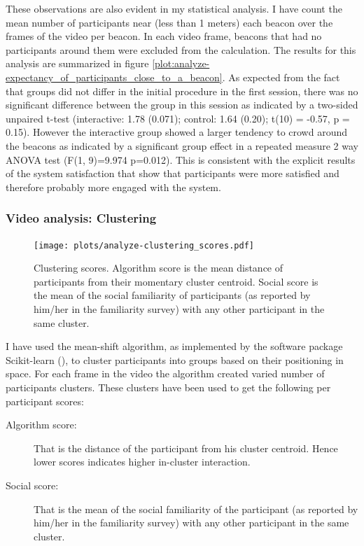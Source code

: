\documentclass[a4paper,11pt]{article}
\begin{document}
{These observations are also evident in my statistical analysis.
I have count the mean number of participants near (less than 1 meters) each beacon over the frames of the video per beacon.
In each video frame, beacons that had no participants around them were excluded from the calculation.
The results for this analysis are summarized in figure \ref{plot:analyze-expectancy_of_participants_close_to_a_beacon}.
As expected from the fact that groups did not differ in the initial procedure in the first session, there was no significant difference between the group in this session as indicated by a two-sided unpaired t-test (interactive: 1.78 (0.071); control: 1.64 (0.20); t(10) = -0.57, p = 0.15).
However the interactive group showed a larger tendency to crowd around the beacons as indicated by a significant group effect in a repeated measure 2 way ANOVA test (F(1, 9)=9.974 p=0.012).
This is consistent with the explicit results of the system satisfaction that show that participants were more satisfied and therefore probably more engaged with the system.

\subsubsection{Video analysis: Clustering}\label{results:clustering}

\begin{figure}[!htb]
    \centering
    \texttt{[image: plots/analyze-clustering\_scores.pdf]}
    \caption{Clustering scores. Algorithm score is the mean distance of participants from their momentary cluster centroid. Social score is the mean of the social familiarity of participants (as reported by him/her in the familiarity survey) with any other participant in the same cluster.}\label{plot:analyze-clustering_scores}
\end{figure}

I have used the mean-shift algorithm, as implemented by the software package Scikit-learn (\cite{scikit-learn}), to cluster participants into groups based on their positioning in space.
For each frame in the video the algorithm created varied number of participants clusters.
These clusters have been used to get the following per participant scores:

\begin{description}
    \item[Algorithm score:] That is the distance of the participant from his cluster centroid.
        Hence lower scores indicates higher in-cluster interaction. \label{results:algorithm_score}
    \item[Social score:] That is the mean of the social familiarity of the participant (as reported by him/her in the familiarity survey) with any other participant in the same cluster. \label{results:social_score}
\end{description}

}
\end{document}
